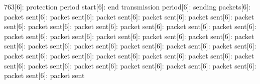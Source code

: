 \documentclass[parskip]{cs4rep}
\begin{document}
763[6]: protection period start[6]: end transmission period[6]: sending packets[6]: packet sent[6]: packet sent[6]: packet sent[6]: packet sent[6]: packet sent[6]: packet sent[6]: packet sent[6]: packet sent[6]: packet sent[6]: packet sent[6]: packet sent[6]: packet sent[6]: packet sent[6]: packet sent[6]: packet sent[6]: packet sent[6]: packet sent[6]: packet sent[6]: packet sent[6]: packet sent[6]: packet sent[6]: packet sent[6]: packet sent[6]: packet sent[6]: packet sent[6]: packet sent[6]: packet sent[6]: packet sent[6]: packet sent[6]: packet sent[6]: packet sent[6]: packet sent[6]: packet sent[6]: packet sent[6]: packet sent\newline
\end{document}
